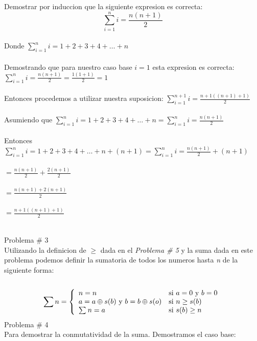 \documentclass[]{article}
\begin{document}
\begin{center}

Demostrar por induccion que la siguiente expresion es correcta: $$\sum_{i=1}^{n} i = \frac{n(n+1)}{2}$$\\
Donde $\sum_{i=1}^{n} i = 1+2+3+4+ \ldots +n$\\~\\
Demostrando que para nuestro caso base $i=1$ esta expresion es correcta: $\sum_{i=1}^{n} i = \frac{n(n+1)}{2} = \frac{1(1+1)}{2} = 1$\\~\\
Entonces procedemos a utilizar nuestra suposicion: $\sum_{i=1}^{n+1} i = \frac{n+1((n+1)+1)}{2}$\\~\\
Asumiendo que $\sum_{i=1}^{n} i = 1+2+3+4+ \ldots +n = \sum_{i=1}^{n} i = \frac{n(n+1)}{2}$\\~\\
Entonces $\sum_{i=1}^{n} i = 1+2+3+4+ \ldots +n+(n+1) = \sum_{i=1}^{n} i = \frac{n(n+1)}{2}+(n+1)$\\~\\
$= \frac{n(n+1)}{2}+\frac{2(n+1)}{2}$\\~\\
$= \frac{n(n+1)+2(n+1)}{2}$\\~\\
$= \frac{n+1((n+1)+1)}{2}$\\~\\
\end{center}
\newpage
\Large
Problema \# 3\\
\normalsize
Utilizando la definicion de $\geq$ dada en el \emph{Problema \# 5} y la suma dada en este problema podemos definir la sumatoria de todos los numeros hasta \emph{n} de la siguiente forma:\\~\\
\[
        \sum_{}^{} n =
                \left\{
                        \begin{array}{ll}
                                n = n  & \mbox{si } a = 0$ y $b = 0\\
                                a = a \oplus s(b)$ y $b = b \oplus s(o) & \mbox{si } n \geq s(b) \\
                                \sum_{}^{}n = a & \mbox{si } s(b) \geq n\\
                        \end{array}
                \right.
\]
\Large
Problema \# 4\\
\normalsize
Para demostrar la conmutatividad de la suma. Demostramos el caso base:\\
\end{document}
